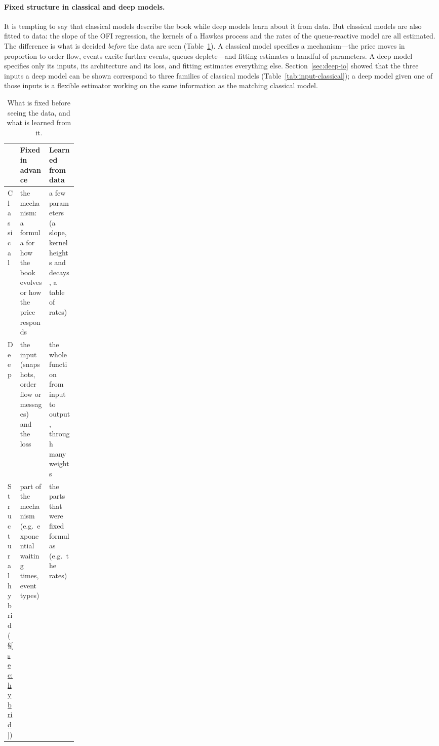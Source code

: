 \paragraph{Fixed structure in classical and deep models.} It is tempting to say
that classical models describe the book while deep models learn about it from data. But classical models are
also fitted to data: the slope of the OFI regression, the kernels of a Hawkes process and the rates of the
queue-reactive model are all estimated. The difference is what is decided \emph{before} the data are seen
(Table~\ref{tab:fixed-learned}). A classical model specifies a mechanism---the price moves in proportion to order
flow, events excite further events, queues deplete---and fitting estimates a handful of parameters. A deep model
specifies only its inputs, its architecture and its loss, and fitting estimates everything else. Section~\ref{sec:deep-io}
showed that the three inputs a deep model can be shown correspond to three families of classical models
(Table~\ref{tab:input-classical}); a deep model given one of those inputs is a flexible estimator working on the
same information as the matching classical model.

\begin{table}[!htbp]
\centering\footnotesize
\caption{What is fixed before seeing the data, and what is learned from it.}
\label{tab:fixed-learned}
\begin{tabularx}{\linewidth}{>{\raggedright\arraybackslash}p{0.16\linewidth}>{\raggedright\arraybackslash}X>{\raggedright\arraybackslash}X}
\toprule
& Fixed in advance & Learned from data \\
\midrule
Classical & the mechanism: a formula for how the book evolves or how the price responds & a few parameters (a slope, kernel heights and decays, a table of rates) \\
Deep & the input (snapshots, order flow or messages) and the loss & the whole function from input to output, through many weights \\
Structural hybrid (\S\ref{sec:hybrid}) & part of the mechanism (e.g.\ exponential waiting times, event types) & the parts that were fixed formulas (e.g.\ the rates) \\
\bottomrule
\end{tabularx}
\end{table}

